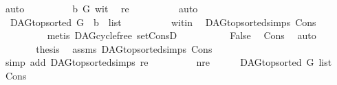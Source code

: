 \begin{isabellebody}
\ auto\isanewline
\ \ \ \ \ \ \isamarkupfalse%
\ \isamarkupfalse%
\ {\isachardoublequoteopen}b\ {\isasymrightarrow}\isactrlsup {\isacharplus}{\kern0pt}\isactrlbsub G\isactrlesub \ wit{\isachardoublequoteclose}\ \isamarkupfalse%
\ re\isanewline
\ \ \ \ \ \ \ \ \isamarkupfalse%
\ auto\ \isanewline
\ \ \ \ \ \ \isamarkupfalse%
\ \isamarkupfalse%
\ {\isachardoublequoteopen}{\isasymnot}\ DAG{\isachardot}{\kern0pt}top{\isacharunderscore}{\kern0pt}sorted\ G\ \ {\isacharparenleft}{\kern0pt}b\ {\isacharhash}{\kern0pt}\ list{\isacharparenright}{\kern0pt}{\isachardoublequoteclose}\isanewline
\ \ \ \ \ \ \ \ \isamarkupfalse%
\ wit{\isacharunderscore}{\kern0pt}in\ \isamarkupfalse%
\ DAG{\isachardot}{\kern0pt}top{\isacharunderscore}{\kern0pt}sorted{\isachardot}{\kern0pt}simps{\isacharparenleft}{\kern0pt}{}{\isacharparenright}{\kern0pt}\ Cons{\isacharparenleft}{\kern0pt}{}{\isacharparenright}{\kern0pt}\isanewline
\ \ \ \ \ \ \ \ \isamarkupfalse%
\ {\isacharparenleft}{\kern0pt}metis\ DAG{\isachardot}{\kern0pt}cycle{\isacharunderscore}{\kern0pt}free\ set{\isacharunderscore}{\kern0pt}ConsD{\isacharparenright}{\kern0pt}\ \isanewline
\ \ \ \ \ \ \isamarkupfalse%
\ \isamarkupfalse%
\ {\isachardoublequoteopen}False{\isachardoublequoteclose}\ \isamarkupfalse%
\ Cons\ \isamarkupfalse%
\ auto\ \isanewline
\ \ \ \ \isamarkupfalse%
\isanewline
\ \ \ \ \isamarkupfalse%
\ \isamarkupfalse%
\ {\isacharquery}{\kern0pt}thesis\ \isamarkupfalse%
\ assms{\isacharparenleft}{\kern0pt}{}{\isacharparenright}{\kern0pt}\ DAG{\isachardot}{\kern0pt}top{\isacharunderscore}{\kern0pt}sorted{\isachardot}{\kern0pt}simps\ Cons\isanewline
\ \ \ \ \ \ \isamarkupfalse%
\ {\isacharparenleft}{\kern0pt}simp\ add{\isacharcolon}{\kern0pt}\ DAG{\isachardot}{\kern0pt}top{\isacharunderscore}{\kern0pt}sorted{\isachardot}{\kern0pt}simps{\isacharparenleft}{\kern0pt}{}{\isacharparenright}{\kern0pt}\ re{\isacharparenright}{\kern0pt}\ \isanewline
\ \ \isamarkupfalse%
\isanewline
\ \ \ \ \isamarkupfalse%
\ nre\isanewline
\ \ \ \ \isamarkupfalse%
\ {\isachardoublequoteopen}DAG{\isachardot}{\kern0pt}top{\isacharunderscore}{\kern0pt}sorted\ G\ list{\isachardoublequoteclose}\ \isamarkupfalse%
\ Cons{\isacharparenleft}{\kern0pt}{}{\isacharcomma}{\kern0pt}{}{\isacharparenright}{\kern0pt}\isanewline

\end{isabellebody}
